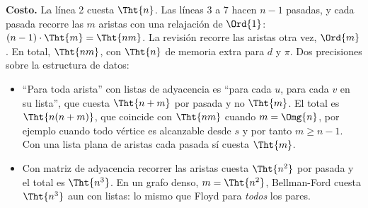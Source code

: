 \documentclass[11pt,letterpaper]{article}
\begin{document}
\textbf{Costo.} La línea 2 cuesta $\Tht{n}$. Las líneas 3 a 7 hacen
$n - 1$ pasadas, y cada pasada recorre las $m$ aristas con una
relajación de $\Ord{1}$: $(n - 1) \cdot \Tht{m} = \Tht{nm}$. La
revisión recorre las aristas otra vez, $\Ord{m}$. En total,
$\Tht{nm}$, con $\Tht{n}$ de memoria extra para $d$ y $\pi$. Dos
precisiones sobre la estructura de datos:
\begin{itemize}[itemsep=0.1em]
  \item ``Para toda arista'' con listas de adyacencia es ``para cada
        $u$, para cada $v$ en su lista'', que cuesta $\Tht{n + m}$
        por pasada y no $\Tht{m}$. El total es $\Tht{n(n + m)}$, que
        coincide con $\Tht{nm}$ cuando $m = \Omg{n}$, por ejemplo
        cuando todo vértice es alcanzable desde $s$ y por tanto
        $m \ge n - 1$. Con una lista plana de aristas cada pasada sí
        cuesta $\Tht{m}$.
  \item Con matriz de adyacencia recorrer las aristas cuesta
        $\Tht{n^2}$ por pasada y el total es $\Tht{n^3}$. En un grafo
        denso, $m = \Tht{n^2}$, Bellman-Ford cuesta $\Tht{n^3}$ aun
        con listas: lo mismo que Floyd para \emph{todos} los pares.
\end{itemize}
\end{document}
